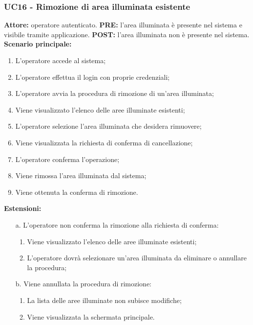 \documentclass[a4paper, 12pt]{article}
\begin{document}
\subsubsection{UC16 - Rimozione di area illuminata esistente}
\textbf{Attore:} operatore autenticato.\newline
\textbf{PRE:} l'area illuminata è presente nel sistema e visibile tramite applicazione.\newline
\textbf{POST:} l'area illuminata non è presente nel sistema.\newline
\textbf{Scenario principale:}
\begin{enumerate}
    \item L'operatore accede al sistema;
    \item L'operatore effettua il login con proprie credenziali;
    \item L'operatore avvia la procedura di rimozione di un'area illuminata;
    \item Viene visualizzato l'elenco delle aree illuminate esistenti;
    \item L'operatore selezione l'area illuminata che desidera rimuovere;
    \item Viene visualizzata la richiesta di conferma di cancellazione;
    \item L'operatore conferma l'operazione;
    \item Viene rimossa l'area illuminata dal sistema;
    \item Viene ottenuta la conferma di rimozione.
\end{enumerate}
\textbf{Estensioni:}
\begin{itemize}
    \item [a.] L'operatore non conferma la rimozione alla richiesta di conferma:
    \begin{enumerate}
        \item Viene visualizzato l'elenco delle aree illuminate esistenti;
        \item L'operatore dovrà selezionare un'area illuminata da eliminare o annullare la procedura;
    \end{enumerate}
    \item [b.] Viene annullata la procedura di rimozione:
    \begin{enumerate}
        \item La lista delle aree illuminate non subisce modifiche;
        \item Viene visualizzata la schermata principale.
    \end{enumerate}
\end{itemize}
\end{document}
